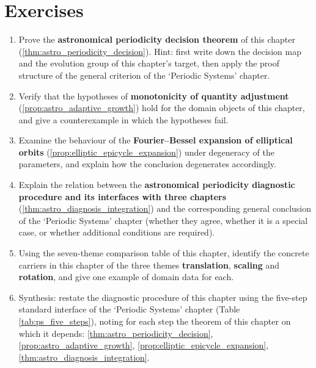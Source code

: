 \section*{Exercises}

\begin{enumerate}[leftmargin=3em, label=\textbf{Exercise \arabic*}]
    \item Prove the \textbf{astronomical periodicity decision theorem} of this chapter (\ref{thm:astro_periodicity_decision}). Hint: first write down the decision map and the evolution group of this chapter's target, then apply the proof structure of the general criterion of the `Periodic Systems' chapter.

    \item Verify that the hypotheses of \textbf{monotonicity of quantity adjustment} (\ref{prop:astro_adaptive_growth}) hold for the domain objects of this chapter, and give a counterexample in which the hypotheses fail.

    \item Examine the behaviour of the \textbf{Fourier--Bessel expansion of elliptical orbits} (\ref{prop:elliptic_epicycle_expansion}) under degeneracy of the parameters, and explain how the conclusion degenerates accordingly.

    \item Explain the relation between the \textbf{astronomical periodicity diagnostic procedure and its interfaces with three chapters} (\ref{thm:astro_diagnosis_integration}) and the corresponding general conclusion of the `Periodic Systems' chapter (whether they agree, whether it is a special case, or whether additional conditions are required).

    \item Using the seven-theme comparison table of this chapter, identify the concrete carriers in this chapter of the three themes \textbf{translation}, \textbf{scaling} and \textbf{rotation}, and give one example of domain data for each.

    \item Synthesis: restate the diagnostic procedure of this chapter using the five-step standard interface of the `Periodic Systems' chapter (Table \ref{tab:ps_five_steps}), noting for each step the theorem of this chapter on which it depends: \ref{thm:astro_periodicity_decision}, \ref{prop:astro_adaptive_growth}, \ref{prop:elliptic_epicycle_expansion}, \ref{thm:astro_diagnosis_integration}.
\end{enumerate}


